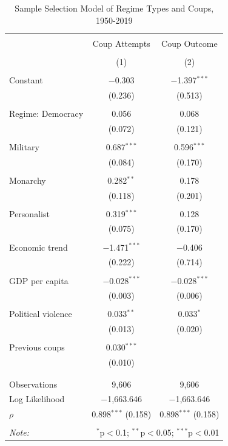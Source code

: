 \documentclass[
  12pt,
]{report}
\begin{document}
\begin{table}[!htbp] \centering 
  \caption{Sample Selection Model of Regime Types and Coups, 1950-2019} 
  \label{results} 
\begin{tabular}{@{\extracolsep{50pt}}lcc} 
\\[-1.8ex]\hline 
\hline \\[-1.8ex] 
 & Coup Attempts & Coup Outcome \\ 
\\[-1.8ex] & (1) & (2)\\ 
\hline \\[-1.8ex] 
 Constant & $-$0.303 & $-$1.397$^{***}$ \\ 
  & (0.236) & (0.513) \\ 
  & & \\ 
 Regime: Democracy & 0.056 & 0.068 \\ 
  & (0.072) & (0.121) \\ 
  & & \\ 
 \hspace{1.6cm}Military & 0.687$^{***}$ & 0.596$^{***}$ \\ 
  & (0.084) & (0.170) \\ 
  & & \\ 
 \hspace{1.6cm}Monarchy & 0.282$^{**}$ & 0.178 \\ 
  & (0.118) & (0.201) \\ 
  & & \\ 
 \hspace{1.6cm}Personalist & 0.319$^{***}$ & 0.128 \\ 
  & (0.075) & (0.170) \\ 
  & & \\ 
 Economic trend & $-$1.471$^{***}$ & $-$0.406 \\ 
  & (0.222) & (0.714) \\ 
  & & \\ 
  GDP per capita & $-$0.028$^{***}$ & $-$0.028$^{***}$ \\ 
  & (0.003) & (0.006) \\ 
  & & \\ 
 Political violence & 0.033$^{**}$ & 0.033$^{*}$ \\ 
  & (0.013) & (0.020) \\ 
  & & \\ 
 Previous coups & 0.030$^{***}$ &  \\ 
  & (0.010) &  \\ 
  & & \\ 
\hline \\[-1.8ex] 
Observations & 9,606 & 9,606 \\ 
Log Likelihood & $-$1,663.646 & $-$1,663.646 \\ 
$\rho$ & 0.898$^{***}$  (0.158) & 0.898$^{***}$  (0.158) \\ 
\hline 
\hline \\[-1.8ex] 
\textit{Note:}  & \multicolumn{2}{r}{$^{*}$p$<$0.1; $^{**}$p$<$0.05; $^{***}$p$<$0.01} \\ 
\end{tabular} 
\end{table}
\end{document}
